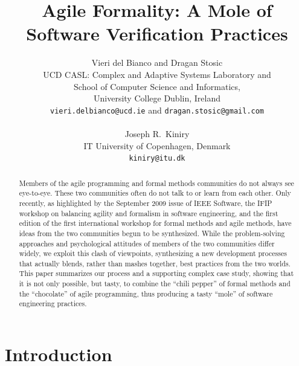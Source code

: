 \documentclass[english]{lni}
\begin{document}
\title{Agile Formality: A Mole of Software Verification Practices}

\author{Vieri del Bianco and Dragan Stosic\\
  UCD CASL: Complex and Adaptive Systems Laboratory and\\
  School of Computer Science and Informatics,\\
  University College Dublin, Ireland\\
  \texttt{vieri.delbianco@ucd.ie} and \texttt{dragan.stosic@gmail.com}\\
  \\
  Joseph R.~Kiniry \\
  IT University of Copenhagen, Denmark\\
  \texttt{kiniry@itu.dk}
}

\maketitle

\begin{abstract}

  Members of the agile programming and formal methods communities do
  not always see eye-to-eye.  These two communities often do not talk
  to or learn from each other.  Only recently, as highlighted by the
  September 2009 issue of IEEE Software, the IFIP workshop on
  balancing agility and formalism in software engineering, and the
  first edition of the first international workshop for formal methods
  and agile methods, have ideas from the two communities begun to be
  synthesized.  While the problem-solving approaches and psychological
  attitudes of members of the two communities differ widely, we
  exploit this clash of viewpoints, synthesizing a new development
  processes that actually blends, rather than mashes together, best
  practices from the two worlds.  This paper summarizes our process
  and a supporting complex case study, showing that it is not only
  possible, but tasty, to combine the ``chili pepper'' of formal
  methods and the ``chocolate'' of agile programming, thus producing a
  tasty ``mole'' of software engineering practices.

\end{abstract}

\section{Introduction}
\label{sec:introduction}
\end{document}

